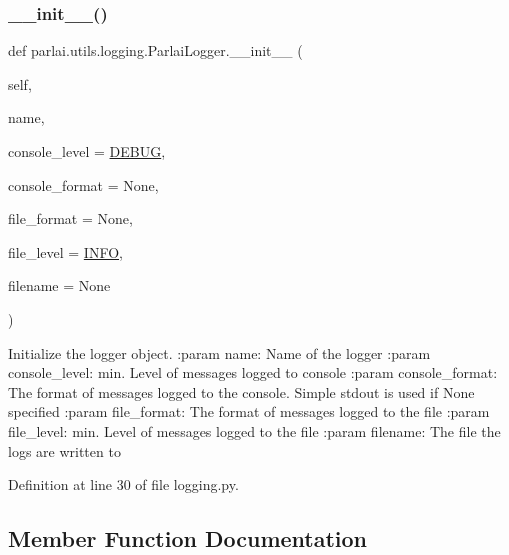 \subsubsection{\texorpdfstring{\+\_\+\+\_\+init\+\_\+\+\_\+()}{\_\_init\_\_()}}
{\footnotesize\ttfamily def parlai.\+utils.\+logging.\+Parlai\+Logger.\+\_\+\+\_\+init\+\_\+\+\_\+ (\begin{DoxyParamCaption}\item[{}]{self,  }\item[{}]{name,  }\item[{}]{console\+\_\+level = {\ttfamily \hyperlink{namespaceparlai_1_1utils_1_1logging_ab324194e88a7aab20579ec176d8e47ed}{D\+E\+B\+UG}},  }\item[{}]{console\+\_\+format = {\ttfamily None},  }\item[{}]{file\+\_\+format = {\ttfamily None},  }\item[{}]{file\+\_\+level = {\ttfamily \hyperlink{namespaceparlai_1_1utils_1_1logging_a4bc2de74317465e5d1a8b5d7b913d48a}{I\+N\+FO}},  }\item[{}]{filename = {\ttfamily None} }\end{DoxyParamCaption})}

\begin{DoxyVerb}Initialize the logger object.
:param name:
    Name of the logger
:param console_level:
    min. Level of messages logged to console
:param console_format:
    The format of messages logged to the console.
    Simple stdout is used if None specified
:param file_format:
    The format of messages logged to the file
:param file_level:
    min. Level of messages logged to the file
:param filename:
    The file the logs are written to
\end{DoxyVerb}
 

Definition at line 30 of file logging.\+py.



\subsection{Member Function Documentation}
\mbox{\label{classparlai_1_1utils_1_1logging_1_1ParlaiLogger_abaeed79f85f8b00792bcb3557f955e9e}} 
